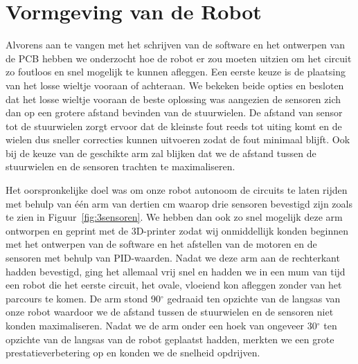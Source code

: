  
\chapter{Vormgeving van de Robot}
 




Alvorens aan te vangen met het schrijven van de software en het ontwerpen van de PCB hebben we onderzocht hoe de robot er zou moeten uitzien om het circuit zo foutloos en snel mogelijk te kunnen afleggen. Een eerste keuze is de plaatsing van het losse wieltje vooraan of achteraan. We bekeken beide opties en besloten dat het losse wieltje vooraan de beste oplossing was aangezien de sensoren zich dan op een grotere afstand bevinden van de stuurwielen. De afstand van sensor tot de stuurwielen zorgt ervoor dat de kleinste fout reeds tot uiting komt en de wielen dus sneller correcties kunnen uitvoeren zodat de fout minimaal blijft. Ook bij de keuze van de geschikte arm zal blijken dat we de afstand tussen de stuurwielen en de sensoren trachten te maximaliseren.

Het oorspronkelijke doel was om onze robot autonoom de circuits te laten rijden met behulp van \'e\'en arm van dertien cm waarop drie sensoren bevestigd zijn zoals te zien in Figuur~\ref{fig:3sensoren}. We hebben dan ook zo snel mogelijk deze arm ontworpen en geprint met de 3D-printer zodat wij onmiddellijk konden beginnen met het ontwerpen van de software en het afstellen van de motoren en de sensoren met behulp van PID-waarden. Nadat we deze arm aan de rechterkant hadden bevestigd, ging het allemaal vrij snel en hadden we in een mum van tijd een robot die het eerste circuit, het ovale, vloeiend kon afleggen zonder van het parcours te komen. De arm stond 90$^\circ$ gedraaid ten opzichte van de langsas van onze robot waardoor we de afstand tussen de stuurwielen en de sensoren niet konden maximaliseren. Nadat we de arm onder een hoek van ongeveer 30$^\circ$ ten opzichte van de langsas van de robot geplaatst hadden, merkten we een grote prestatieverbetering op en konden we de snelheid opdrijven.



